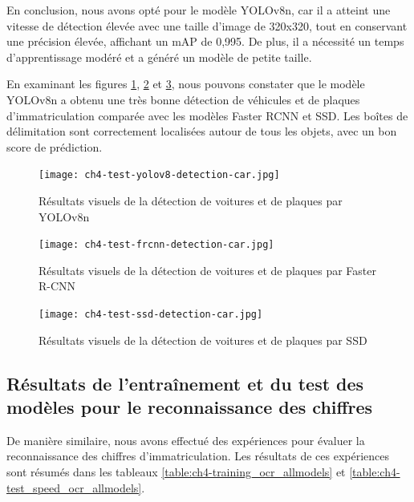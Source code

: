 En conclusion, nous avons opté pour le modèle YOLOv8n, car il a atteint une vitesse de détection élevée avec une taille d'image de 320x320, tout en conservant une précision élevée, affichant un mAP de 0,995. De plus, il a nécessité un temps d'apprentissage modéré et a généré un modèle de petite taille.

En examinant les figures \ref{fig:ch4-test-yolov8-detection-car}, \ref{fig:ch4-test-frcnn-detection-car} et \ref{fig:ch4-test-ssd-detection-car}, nous pouvons constater que le modèle YOLOv8n a obtenu une très bonne détection de véhicules et de plaques d'immatriculation comparée avec les modèles Faster RCNN et SSD. Les boîtes de délimitation sont correctement localisées autour de tous les objets, avec un bon score de prédiction.

\begin{figure}[H]
	\centering
	\texttt{[image: ch4-test-yolov8-detection-car.jpg]}
	\caption{Résultats visuels de la détection de voitures et de plaques par YOLOv8n}
 \label{fig:ch4-test-yolov8-detection-car}
\end{figure}

\begin{figure}[H]
	\centering
	\texttt{[image: ch4-test-frcnn-detection-car.jpg]}
	\caption{Résultats visuels de la détection de voitures et de plaques par Faster R-CNN}
\label{fig:ch4-test-frcnn-detection-car}
\end{figure}

\begin{figure}[H]
	\centering
	\texttt{[image: ch4-test-ssd-detection-car.jpg]}
	\caption{Résultats visuels de la détection de voitures et de plaques par SSD}
\label{fig:ch4-test-ssd-detection-car}
\end{figure}



\subsection{Résultats de l'entraînement et du test des modèles pour le reconnaissance des chiffres}


De manière similaire, nous avons effectué des expériences pour évaluer la reconnaissance des chiffres d'immatriculation. Les résultats de ces expériences sont résumés dans les tableaux \ref{table:ch4-training_ocr_allmodels} et \ref{table:ch4-test_speed_ocr_allmodels}.

